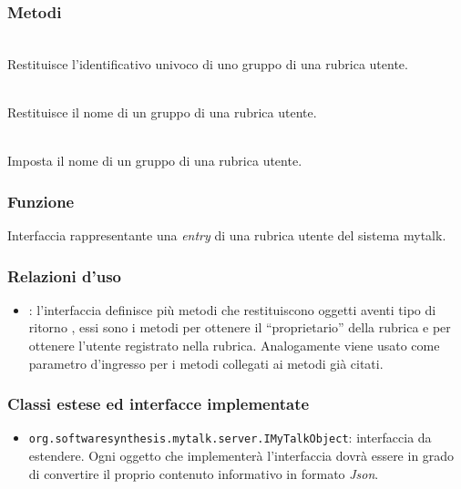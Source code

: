 \subsubsection*{Metodi}
\begin{description}
	\item{}\\
	Restituisce l'identificativo univoco di uno gruppo di una rubrica utente.
	\item{}\\
	Restituisce il nome di un gruppo di una rubrica utente.
	\item{}\\
	Imposta il nome di un gruppo di una rubrica utente.
\end{description}


\subsubsection*{Funzione}
Interfaccia rappresentante una \textit{entry} di una rubrica utente del sistema mytalk.

\subsubsection*{Relazioni d'uso}
\begin{itemize}
	\item {}: l'interfaccia  definisce più metodi che restituiscono oggetti aventi tipo di ritorno , essi sono i metodi  per ottenere il ``proprietario'' della rubrica e per ottenere l'utente registrato nella rubrica. Analogamente  viene usato come parametro d'ingresso per i metodi  collegati ai metodi già citati.
\end{itemize}

\subsubsection*{Classi estese ed interfacce implementate}
\begin{itemize}
		\item \texttt{org.softwaresynthesis.mytalk.server.IMyTalkObject}: interfaccia da estendere. Ogni oggetto che implementerà l'interfaccia  dovrà essere in grado di convertire il proprio contenuto informativo in formato \textit{Json}.
\end{itemize}

